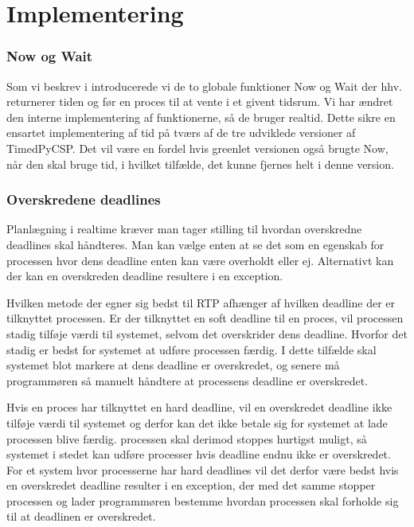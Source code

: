 \section{Implementering}\label{sec:deadline-implementation}

\subsubsection{Now og Wait}
Som vi beskrev i \des introducerede vi de to globale funktioner Now og Wait der hhv. returnerer tiden og før en proces til at vente i et givent tidsrum. Vi har ændret den interne implementering af funktionerne, så de bruger realtid. Dette sikre en ensartet implementering af tid på tværs af de tre udviklede versioner af TimedPyCSP. Det vil være en fordel hvis greenlet versionen også brugte Now, når den skal bruge tid, i hvilket tilfælde, det kunne fjernes helt i denne version. 

\subsubsection{Overskredene deadlines}
Planlægning i realtime kræver man tager stilling til  hvordan  overskredne deadlines skal håndteres. Man kan vælge enten at se det som en egenskab for processen hvor dens deadline enten kan være overholdt eller ej. Alternativt kan der kan en overskreden deadline resultere i en exception.

Hvilken metode der egner sig bedst til RTP afhænger af hvilken deadline der er tilknyttet processen. Er der tilknyttet en soft deadline til en proces, vil processen stadig tilføje værdi til systemet, selvom det  overskrider dens deadline. Hvorfor  det stadig er bedst for systemet at udføre processen færdig. I dette tilfælde  skal systemet blot markere at dens deadline er overskredet, og senere må programmøren så manuelt håndtere at processens deadline er overskredet. 


Hvis en proces har tilknyttet  en hard deadline, vil en overskredet deadline  ikke tilføje værdi til systemet og derfor kan det ikke betale sig for systemet at lade processen blive færdig. processen skal derimod stoppes hurtigst muligt, så systemet i stedet kan udføre processer hvis deadline endnu ikke er overskredet. For et system hvor processerne har hard deadlines vil det derfor være bedst hvis en overskredet deadline resulter i en exception, der med det samme stopper processen og lader programmøren bestemme hvordan processen skal forholde sig til at deadlinen er overskredet.

